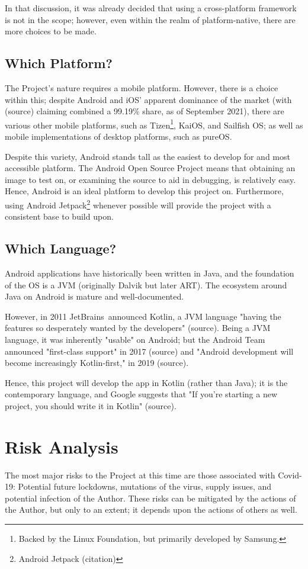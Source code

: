 \documentclass[11pt, a4paper, notitlepage]{report}
\begin{document}
In that discussion, it was already decided that using a cross-platform 
framework is not in the scope; however, even within the realm of 
platform-native, there are more choices to be made.

\subsection{Which Platform?}
The Project's nature requires a mobile platform. However, there is a choice 
within this; despite Android and iOS' apparent dominance of the market (with 
(source) claiming combined a 99.19\% share, as of September 2021), there 
are various other mobile platforms, such as Tizen\footnote{Backed by the Linux 
Foundation, but primarily developed by Samsung.}, KaiOS, and Sailfish OS; as 
well as mobile implementations of desktop platforms, such as pureOS.

Despite this variety, Android stands tall as the easiest to develop for and 
most accessible platform. The Android Open Source Project means that obtaining 
an image to test on, or examining the source to aid in debugging, is relatively 
easy. Hence, Android is an ideal platform to develop this project on. 
Furthermore, using Android Jetpack\footnote{Android Jetpack (citation)} 
whenever possible will provide the project with a consistent base to build upon.

\subsection{Which Language?}
Android applications have historically been written in Java, and the foundation 
of the OS is a JVM (originally Dalvik but later ART). The ecosystem around Java 
on Android is mature and well-documented.

However, in 2011 JetBrains\texttrademark\ announced Kotlin, a JVM language 
"having the features so desperately wanted by the developers" (source). Being a 
JVM language, it was inherently "usable" on Android; but the Android Team 
announced "first-class support" in 2017 (source) and "Android development will 
become increasingly Kotlin-first," in 2019 (source).

Hence, this project will develop the app in Kotlin (rather than Java); it is 
the contemporary language, and Google suggests that "If you’re starting a new 
project, you should write it in Kotlin" (source).

\section{Risk Analysis}
The most major risks to the Project at this time are those associated with 
Covid-19: Potential future lockdowns, mutations of the virus, supply issues, 
and potential infection of the Author. These risks can be mitigated by the 
actions of the Author, but only to an extent; it depends upon the actions of 
others as well.
\end{document}
